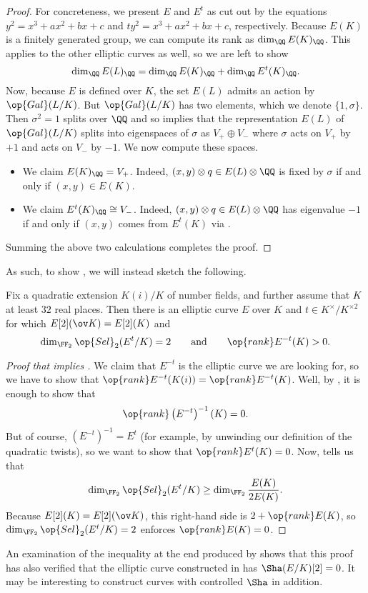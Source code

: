 \documentclass[../notes.tex]{subfiles}
\begin{document}
\begin{proof}
	For concreteness, we present $E$ and $E^t$ as cut out by the equations $y^2=x^3+ax^2+bx+c$ and $ty^2=x^3+ax^2+bx+c$, respectively. Because $E(K)$ is a finitely generated group, we can compute its rank as $\dim_\QQ E(K)_\QQ$. This applies to the other elliptic curves as well, so we are left to show
	\[\dim_\QQ E(L)_\QQ=\dim_\QQ E(K)_\QQ+\dim_\QQ E^t(K)_\QQ.\]
	Now, because $E$ is defined over $K$, the set $E(L)$ admits an action by $\op{Gal}(L/K)$. But $\op{Gal}(L/K)$ has two elements, which we denote $\{1,\sigma\}$. Then $\sigma^2=1$ splits over $\QQ$ and so implies that the representation $E(L)$ of $\op{Gal}(L/K)$ splits into eigenspaces of $\sigma$ as $V_+\oplus V_-$ where $\sigma$ acts on $V_+$ by $+1$ and acts on $V_-$ by $-1$. We now compute these spaces.
	\begin{itemize}
		\item We claim $E(K)_\QQ=V_+$. Indeed, $(x,y)\otimes q\in E(L)\otimes\QQ$ is fixed by $\sigma$ if and only if $(x,y)\in E(K)$.
		\item We claim $E^t(K)_\QQ\cong V_-$. Indeed, $(x,y)\otimes q\in E(L)\otimes\QQ$ has eigenvalue $-1$ if and only if $(x,y)$ comes from $E^t(K)$ via .
	\end{itemize}
	Summing the above two calculations completes the proof.
\end{proof}
As such, to show , we will instead sketch the following.
\begin{theorem} \label{thm:kp-by-twist}
	Fix a quadratic extension $K(i)/K$ of number fields, and further assume that $K$ at least $32$ real places. Then there is an elliptic curve $E$ over $K$ and $t\in K^\times/K^{\times2}$ for which $E[2](\ov K)=E[2](K)$ and
	\[\dim_{\FF_2}\op{Sel}_2(E^t/K)=2\qquad\text{and}\qquad\op{rank}E^{-t}(K)>0.\]
\end{theorem}
\begin{proof}[Proof that  implies ]
	We claim that $E^{-t}$ is the elliptic curve we are looking for, so we have to show that $\op{rank}E^{-t}(K(i))=\op{rank}E^{-t}(K)$. Well, by , it is enough to show that
	\[\op{rank}\left(E^{-t}\right)^{-1}(K)=0.\]
	But of course, $\left(E^{-t}\right)^{-1}=E^t$ (for example, by unwinding our definition of the quadratic twists), so we want to show that $\op{rank}E^t(K)=0$. Now,  tells us that
	\[\dim_{\FF_2}\op{Sel}_2(E^t/K)\ge\dim_{\FF_2}\frac{E(K)}{2E(K)}.\]
	Because $E[2](K)=E[2](\ov K)$, this right-hand side is $2+\op{rank}E(K)$, so $\dim_{\FF_2}\op{Sel}_2(E^t/K)=2$ enforces $\op{rank}E(K)=0$.
\end{proof}
\begin{remark}
	An examination of the inequality at the end produced by  shows that this proof has also verified that the elliptic curve constructed in  has $\Sha(E/K)[2]=0$. It may be interesting to construct curves with controlled $\Sha$ in addition.
\end{remark}
\end{document}
